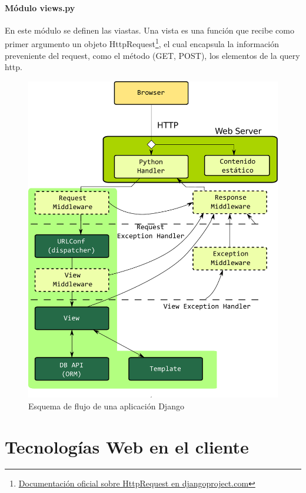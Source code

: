 \documentclass[a4paper]{report}
\begin{document}
\subsubsection*{Módulo views.py}
En este módulo se definen las viastas. Una vista es una función que recibe como primer
argumento un objeto HttpRequest\footnote{
\href{http://docs.djangoproject.com/en/dev/ref/request-response/\#httprequest-objects}
{Documentación oficial sobre HttpRequest en djangoproject.com}}, el cual encapsula la información preveniente del request, 
como el método (GET, POST), los elementos de la query http.
\begin{figure}[htp]
\centering
\includegraphics[scale=0.40]{img/django_strucure.pdf}
\caption{Esquema de flujo de una aplicación Django}\label{fig:erptsqfit}
\end{figure}


\chapter{Tecnologías Web en el cliente}
\end{document}
